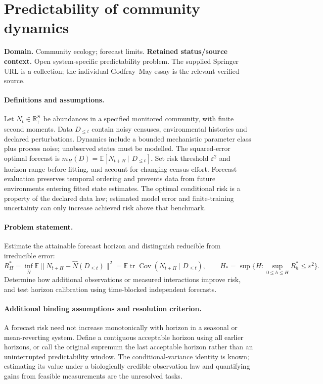 \documentclass[11pt]{article}
\begin{document}
\section*{Predictability of community dynamics}
\label{prob:189}
\label{rank:282}
\par\smallskip

\noindent\textbf{Domain.} Community ecology; forecast limits. \quad \textbf{Retained status/source context.} Open system-specific predictability problem. The supplied Springer URL is a collection; the individual Godfray--May essay is the relevant verified source.
\paragraph{Definitions and assumptions.} Let $N_t\in\mathbb{R}_+^S$ be abundances in a specified monitored community, with finite second moments. Data $D_{\le t}$ contain noisy censuses, environmental histories and declared perturbations. Dynamics include a bounded mechanistic parameter class plus process noise; unobserved states must be modelled. The squared-error optimal forecast is $m_H(D)=\mathbb{E}[N_{t+H}\mid D_{\le t}]$. Set risk threshold $\varepsilon^2$ and horizon range before fitting, and account for changing census effort. Forecast evaluation preserves temporal ordering and prevents data from future environments entering fitted state estimates. The optimal conditional risk is a property of the declared data law; estimated model error and finite-training uncertainty can only increase achieved risk above that benchmark.
\paragraph{Problem statement.} Estimate the attainable forecast horizon and distinguish reducible from irreducible error:
\[
 R_H^*=\inf_{\widehat N}\mathbb{E}\|N_{t+H}-\widehat N(D_{\le t})\|^2
 =\mathbb{E}\operatorname{tr}\operatorname{Cov}(N_{t+H}\mid D_{\le t}),
 \qquad H_* =\sup\{H:\sup_{0\le h\le H}R_h^*\le\varepsilon^2\}.
\]
Determine how additional observations or measured interactions improve risk, and test horizon calibration using time-blocked independent forecasts.
\paragraph{Additional binding assumptions and resolution criterion.} A forecast risk need not increase monotonically with horizon in a seasonal or mean-reverting system. Define a contiguous acceptable horizon using all earlier horizons, or call the original supremum the last acceptable horizon rather than an uninterrupted predictability window. The conditional-variance identity is known; estimating its value under a biologically credible observation law and quantifying gains from feasible measurements are the unresolved tasks.
\end{document}

